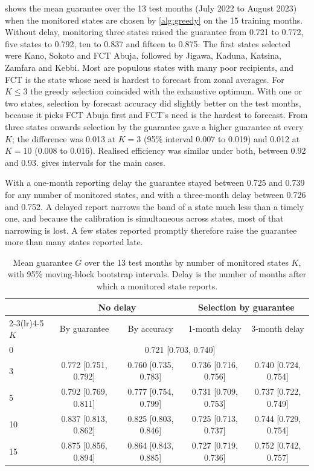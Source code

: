 \documentclass[preprint,12pt,number]{elsarticle}%
\theoremstyle{definition}
\theoremstyle{remark}
\begin{document}
 shows the mean guarantee over the 13 test months (July 2022 to August 2023) when the monitored states are chosen by \cref{alg:greedy} on the 15 training months. Without delay, monitoring three states raised the guarantee from 0.721 to 0.772, five states to 0.792, ten to 0.837 and fifteen to 0.875. The first states selected were Kano, Sokoto and FCT Abuja, followed by Jigawa, Kaduna, Katsina, Zamfara and Kebbi. Most are populous states with many poor recipients, and FCT is the state whose need is hardest to forecast from zonal averages. For $K\le3$ the greedy selection coincided with the exhaustive optimum. With one or two states, selection by forecast accuracy did slightly better on the test months, because it picks FCT Abuja first and FCT's need is the hardest to forecast. From three states onwards selection by the guarantee gave a higher guarantee at every $K$; the difference was 0.013 at $K=3$ (95\% interval 0.007 to 0.019) and 0.012 at $K=10$ (0.008 to 0.016). Realised efficiency was similar under both, between 0.92 and 0.93.  gives intervals for the main cases.

With a one-month reporting delay the guarantee stayed between 0.725 and 0.739 for any number of monitored states, and with a three-month delay between 0.726 and 0.752. A delayed report narrows the band of a state much less than a timely one, and because the calibration is simultaneous across states, most of that narrowing is lost. A few states reported promptly therefore raise the guarantee more than many states reported late.

\begin{table}[t]
\centering
\caption{Mean guarantee $G$ over the 13 test months by number of monitored states $K$, with 95\% moving-block bootstrap intervals. Delay is the number of months after which a monitored state reports.}\label{tab:monitoring}
\small
\begin{tabular}{lcccc}
\toprule
 & \multicolumn{2}{c}{No delay} & \multicolumn{2}{c}{Selection by guarantee}\\
\cmidrule(lr){2-3}\cmidrule(lr){4-5}
$K$ & By guarantee & By accuracy & 1-month delay & 3-month delay\\
\midrule
0 & \multicolumn{4}{c}{0.721 [0.703, 0.740]}\\
3 & 0.772 [0.751, 0.792] & 0.760 [0.735, 0.783] & 0.736 [0.716, 0.756] & 0.740 [0.724, 0.754]\\
5 & 0.792 [0.769, 0.811] & 0.777 [0.754, 0.799] & 0.731 [0.709, 0.753] & 0.737 [0.722, 0.749]\\
10 & 0.837 [0.813, 0.862] & 0.825 [0.803, 0.846] & 0.725 [0.713, 0.737] & 0.744 [0.729, 0.754]\\
15 & 0.875 [0.856, 0.894] & 0.864 [0.843, 0.885] & 0.727 [0.719, 0.736] & 0.752 [0.742, 0.757]\\
\bottomrule
\end{tabular}
\end{table}
\end{document}

